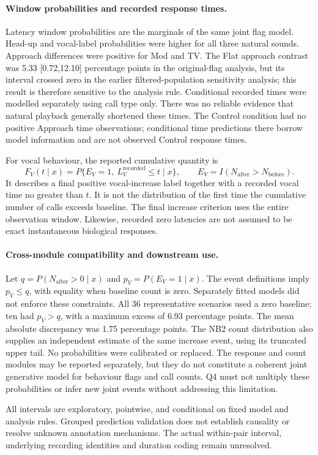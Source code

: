 \paragraph{Window probabilities and recorded response times.}
Latency window probabilities are the marginals of the same joint flag model.
Head-up and vocal-label probabilities were higher for all three natural sounds.
Approach differences were positive for Mod and TV. The Flat approach contrast
was 5.33 [0.72,12.10] percentage points in the original-flag analysis, but its
interval crossed zero in the earlier filtered-population sensitivity analysis;
this result is therefore sensitive to the analysis rule.
Conditional recorded times were modelled separately using call type only.
There was no reliable evidence that natural playback generally shortened these
times. The Control condition had no positive Approach time observations;
conditional time predictions there borrow model information and are not
observed Control response times.

For vocal behaviour, the reported cumulative quantity is
\[
 F_V(t\mid x)=P\{E_V=1,\ L_V^{\mathrm{recorded}}\leq t\mid x\},
 \qquad E_V=I(N_{\mathrm{after}}>N_{\mathrm{before}}).
\]
It describes a final positive vocal-increase label together with a recorded
vocal time no greater than $t$. It is not the distribution of the first time
the cumulative number of calls exceeds baseline. The final increase criterion
uses the entire observation window. Likewise, recorded zero latencies are not
assumed to be exact instantaneous biological responses.

\paragraph{Cross-module compatibility and downstream use.}
Let $q=P(N_{\mathrm{after}}>0\mid x)$ and $p_V=P(E_V=1\mid x)$.
The event definitions imply $p_V\leq q$, with equality when baseline count is
zero. Separately fitted models did not enforce these constraints. All 36
representative scenarios used a zero baseline; ten had $p_V>q$, with a maximum
excess of 6.93 percentage points. The mean absolute discrepancy was 1.75
percentage points. The NB2 count distribution also supplies an independent
estimate of the same increase event, using its truncated upper tail.
No probabilities were calibrated or replaced. The response and count modules
may be reported separately, but they do not constitute a coherent joint
generative model for behaviour flags and call counts. Q4 must not multiply
these probabilities or infer new joint events without addressing this limitation.

All intervals are exploratory, pointwise, and conditional on fixed model and
analysis rules. Grouped prediction validation does not establish causality or
resolve unknown annotation mechanisms. The actual within-pair interval,
underlying recording identities and duration coding remain unresolved.
